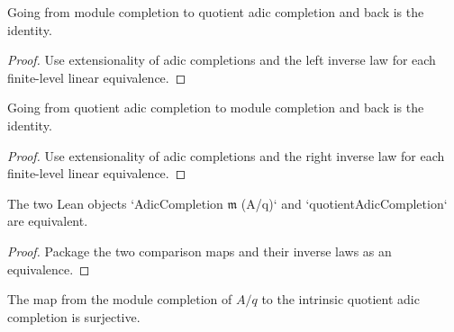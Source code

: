 \begin{lemma}
  \label{lem:quotient_module_completion_to_quotient_adic_completion_left_inverse}
  Going from module completion to quotient adic completion and back is the
  identity.
\end{lemma}

\begin{proof}
  Use extensionality of adic completions and the left inverse law for each
  finite-level linear equivalence.
\end{proof}

\begin{lemma}
  \label{lem:quotient_module_completion_to_quotient_adic_completion_right_inverse}
  Going from quotient adic completion to module completion and back is the
  identity.
\end{lemma}

\begin{proof}
  Use extensionality of adic completions and the right inverse law for each
  finite-level linear equivalence.
\end{proof}

\begin{definition}
  \label{def:quotient_module_completion_equiv_quotient_adic_completion}
  The two Lean objects
  `AdicCompletion \(\mathfrak m\) (A/q)` and
  `quotientAdicCompletion` are equivalent.
\end{definition}

\begin{proof}
  Package the two comparison maps and their inverse laws as an equivalence.
\end{proof}

\begin{lemma}
  \label{lem:quotient_module_completion_to_quotient_adic_completion_surjective}
  The map from the module completion of \(A/q\) to the intrinsic quotient adic
  completion is surjective.
\end{lemma}

